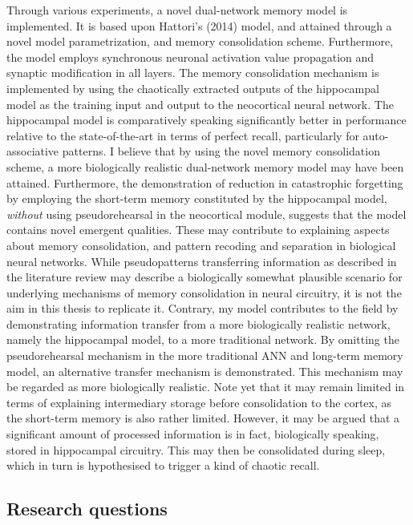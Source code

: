 Through various experiments, a novel dual-network memory model is implemented. It is based upon Hattori's (2014) model, and attained through a novel model parametrization, and memory consolidation scheme. Furthermore, the model employs synchronous neuronal activation value propagation and synaptic modification in all layers. The memory consolidation mechanism is implemented by using the chaotically extracted outputs of the hippocampal model as the training input and output to the neocortical neural network. The hippocampal model is comparatively speaking significantly better in performance relative to the state-of-the-art in terms of perfect recall, particularly for auto-associative patterns. I believe that by using the novel memory consolidation scheme, a more biologically realistic dual-network memory model may have been attained. Furthermore, the demonstration of reduction in catastrophic forgetting by employing the short-term memory constituted by the hippocampal model, \textit{without} using pseudorehearsal in the neocortical module, suggests that the model contains novel emergent qualities. These may contribute to explaining aspects about memory consolidation, and pattern recoding and separation in biological neural networks.
While pseudopatterns transferring information as described in the literature review may describe a biologically somewhat plausible scenario for underlying mechanisms of memory consolidation in neural circuitry, it is not the aim in this thesis to replicate it. Contrary, my model contributes to the field by demonstrating information transfer from a more biologically realistic network, namely the hippocampal model, to a more traditional network. By omitting the pseudorehearsal mechanism in the more traditional ANN and long-term memory model, an alternative transfer mechanism is demonstrated. This mechanism may be regarded as more biologically realistic.
Note yet that it may remain limited in terms of explaining intermediary storage before consolidation to the cortex, as the short-term memory is also rather limited. However, it may be argued that a significant amount of processed information is in fact, biologically speaking, stored in hippocampal circuitry. This may then be consolidated during sleep, which in turn is hypothesised to trigger a kind of chaotic recall.


\subsection*{Research questions}


